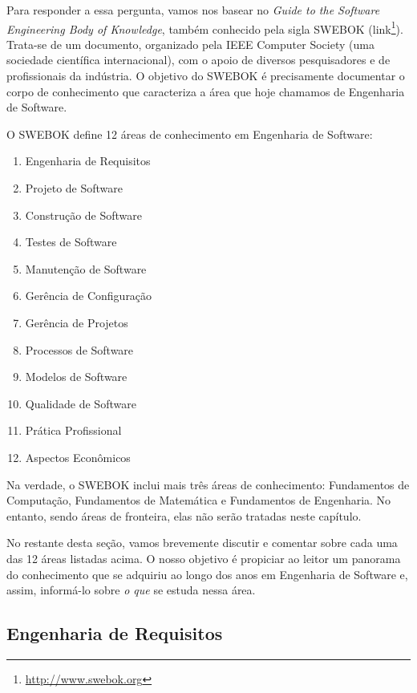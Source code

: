 \documentclass[
  11pt,
  twoside]{book}
\DeclareRobustCommand{\href}[2]{#2\footnote{\url{#1}}}
\begin{document}
 Para responder a essa pergunta, vamos nos basear no
\emph{Guide to the Software Engineering Body of Knowledge}, também
conhecido pela sigla SWEBOK (\href{http://www.swebok.org}{link}).
Trata-se de um documento, organizado pela IEEE Computer Society (uma
sociedade científica internacional), com o apoio de diversos
pesquisadores e de profissionais da indústria. O objetivo do SWEBOK é
precisamente documentar o corpo de conhecimento que caracteriza a área
que hoje chamamos de Engenharia de Software.

O SWEBOK define 12 áreas de conhecimento em Engenharia de Software:

\begin{enumerate}
\def\labelenumi{\arabic{enumi}.}
\item
  Engenharia de Requisitos
\item
  Projeto de Software
\item
  Construção de Software
\item
  Testes de Software
\item
  Manutenção de Software
\item
  Gerência de Configuração
\item
  Gerência de Projetos
\item
  Processos de Software
\item
  Modelos de Software
\item
  Qualidade de Software
\item
  Prática Profissional
\item
  Aspectos Econômicos
\end{enumerate}

Na verdade, o SWEBOK inclui mais três áreas de conhecimento: Fundamentos
de Computação, Fundamentos de Matemática e Fundamentos de Engenharia. No
entanto, sendo áreas de fronteira, elas não serão tratadas neste
capítulo.

No restante desta seção, vamos brevemente discutir e comentar sobre cada
uma das 12 áreas listadas acima. O nosso objetivo é propiciar ao leitor
um panorama do conhecimento que se adquiriu ao longo dos anos em
Engenharia de Software e, assim, informá-lo sobre \emph{o que} se estuda
nessa área.

\hypertarget{engenharia-de-requisitos}{%
\subsection{Engenharia de Requisitos}\label{engenharia-de-requisitos}}
\end{document}
